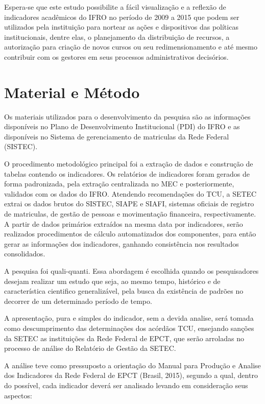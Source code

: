 \documentclass[article,12pt,onesidea,4paper,english,brazil]{abntex2}
\begin{document}
	Espera-se que este estudo possibilite a fácil visualização e a reflexão de indicadores
	acadêmicos do IFRO no período de 2009 a 2015 que podem ser utilizados pela instituição para
	nortear as ações e dispositivos das políticas institucionais, dentre elas, o planejamento da
	distribuição de recursos, a autorização para criação de novos cursos ou seu redimensionamento e
	até mesmo contribuir com os gestores em seus processos administrativos decisórios.
	
	\section*{Material e Método}
	
	Os materiais utilizados para o desenvolvimento da pesquisa são as informações disponíveis
	no Plano de Desenvolvimento Institucional (PDI) do IFRO e as disponíveis no Sistema de
	gerenciamento de matriculas da Rede Federal (SISTEC).
	
	O procedimento metodológico principal foi a extração de dados e construção de tabelas
	contendo os indicadores. Os relatórios de indicadores foram gerados de forma padronizada, pela
	extração centralizada no MEC e posteriormente, validados com os dados do IFRO. Atendendo
	recomendações do TCU, a SETEC extrai os dados brutos do SISTEC, SIAPE e SIAFI, sistemas
	oficiais de registro de matriculas, de gestão de pessoas e movimentação financeira,
	respectivamente. A partir de dados primários extraídos na mesma data por indicadores, serão
	realizados procedimentos de cálculo automatizados dos componentes, para então gerar as
	informações dos indicadores, ganhando consistência nos resultados consolidados.
	
	A pesquisa foi quali-quanti. Essa abordagem é escolhida quando os pesquisadores desejam
	realizar um estudo que seja, ao mesmo tempo, histórico e de característica cientifico
	generalizável, pela busca da existência de padrões no decorrer de um determinado período de
	tempo.
	
	A apresentação, pura e simples do indicador, sem a devida analise, será tomada como
	descumprimento das determinações dos acórdãos TCU, ensejando sanções da SETEC as
	instituições da Rede Federal de EPCT, que serão arroladas no processo de análise do Relatório de
	Gestão da SETEC.
	
	A análise teve como pressuposto a orientação do Manual para Produção e Analise dos
	Indicadores da Rede Federal de EPCT (Brasil, 2015), segundo a qual, dentro do possível, cada
	indicador deverá ser analisado levando em consideração seus aspectos:
	
\end{document}
